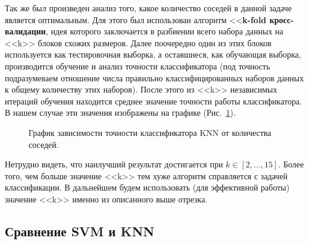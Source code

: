 \documentclass[12pt, a4paper]{article}
\begin{document}
    Так же был произведен анализ того, какое количество соседей в данной задаче 
    является оптимальным. Для этого был использован алгоритм <<\textbf{k-fold 
    кросс-валидации}, идея которого заключается в разбиении всего набора данных на 
    <<k>> блоков схожих размеров. Далее поочередно один из этих блоков 
    используется как тестировочная выборка, а оставшиеся, как обучающая выборка, 
    производится обучение и анализ точности классификатора (под точность подразумеваем 
    отношение числа правильно классифицированных наборов данных к общему количеству 
    этих наборов). После этого из <<k>> независимых итераций обучения находится 
    среднее значение точности работы классификатора. В нашем случае эти значения 
    изображены на графике (Рис.~\ref{image4}).
    
    \begin{figure} [h]
        \caption{График зависимости точности классификатора KNN от количества соседей.}
        \label{image4}
    \end{figure}
    
    Нетрудно видеть, что наилучший результат достигается при $k \in [2, \ldots, 15]$. 
    Более того, чем больше значение <<k>> тем хуже алгоритм справляется с задачей 
    классификации. В дальнейшем будем использовать (для эффективной работы) значение 
    <<k>> именно из описанного выше отрезка.
    
    \subsection{Сравнение SVM и KNN}
    
\end{document}
